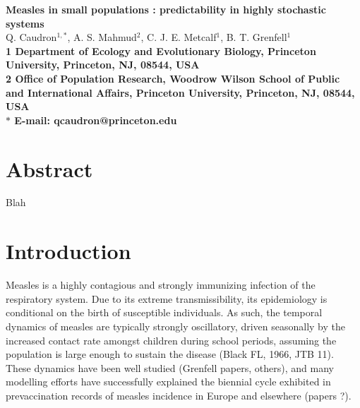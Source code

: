 \documentclass[10pt]{article}
\date{}
\begin{document}
\begin{flushleft}
{\Large
\textbf{Measles in small populations : predictability in highly stochastic systems}
}
\\
Q. Caudron$^{1,\ast}$, 
A. S. Mahmud$^{2}$, 
C. J. E. Metcalf$^{1}$,
B. T. Grenfell$^{1}$
\\
\bf{1} Department of Ecology and Evolutionary Biology, Princeton University, Princeton, NJ, 08544, USA
\\
\bf{2} Office of Population Research, Woodrow Wilson School of Public and International Affairs, Princeton University, Princeton, NJ, 08544, USA
\\
$\ast$ E-mail: qcaudron@princeton.edu
\end{flushleft}













\section*{Abstract}

Blah
















\section*{Introduction}

Measles is a highly contagious and strongly immunizing infection of the respiratory system. Due to its extreme transmissibility, its epidemiology is conditional on the birth of susceptible individuals. As such, the temporal dynamics of measles are typically strongly oscillatory, driven seasonally by the increased contact rate amongst children during school periods, assuming the population is large enough to sustain the disease (Black FL, 1966, JTB 11). These dynamics have been well studied (Grenfell papers, others), and many modelling efforts have successfully explained the biennial cycle exhibited in prevaccination records of measles incidence in Europe and elsewhere (papers ?). 
\end{document}
